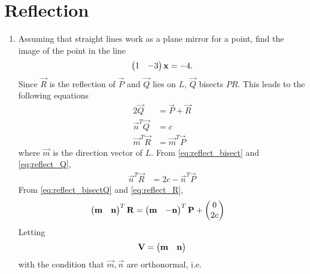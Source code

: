 \documentclass[journal,12pt,twocolumn]{IEEEtran}
\renewcommand\thesection{\arabic{section}}
\begin{document}
\section{Reflection}
\renewcommand{\theequation}{\theenumi}
\begin{enumerate}[label=\thesection.\arabic*.,ref=\thesection.\theenumi]
\item Assuming that straight lines work as a plane mirror for a point, find the image of the point  in the line 
%
\begin{align}
\begin{pmatrix}1 & -3\end{pmatrix}\mathbf{x}  = -4.
\end{align}
%
%
\solution Since $\vec{R}$ is the reflection of $\vec{P}$ and $\vec{Q}$ lies on $L$, $\vec{Q}$ bisects $PR$.  
This leads to the following equations
\begin{align}
\label{eq:reflect_bisect}
2\vec{Q} &= \vec{P}+\vec{R}
\\
\label{eq:reflect_Q}
\vec{n}^{T}\vec{Q} &= c
\\
\label{eq:reflect_R}
\vec{m}^{T}\vec{R} &= \vec{m}^{T}\vec{P}
\end{align}
%
where $\vec{m}$ is the direction vector of $L$.  From \eqref{eq:reflect_bisect} and \eqref{eq:reflect_Q},
\begin{align}
\label{eq:reflect_bisectQ}
\vec{n}^{T}\vec{R}  &= 2c - \vec{n}^{T}\vec{P}
\end{align}
%
From \eqref{eq:reflect_bisectQ} and \eqref{eq:reflect_R},
\begin{align}
\label{eq:reflect_bisectQR}
\begin{pmatrix}\mathbf{m} & \mathbf{n}\end{pmatrix}^T\mathbf{R} &= \begin{pmatrix}\mathbf{m} & -\mathbf{n}\end{pmatrix}^T\mathbf{P}+ \begin{pmatrix}0 \\ 2c\end{pmatrix}
\end{align}
%
Letting 
\begin{align}
\label{eq:reflect_mat}
\mathbf{V}=  \begin{pmatrix}\mathbf{m} & \mathbf{n}\end{pmatrix}
\end{align}
with the condition that $\vec{m},\vec{n}$ are orthonormal, i.e.

\end{enumerate}
\end{document}
